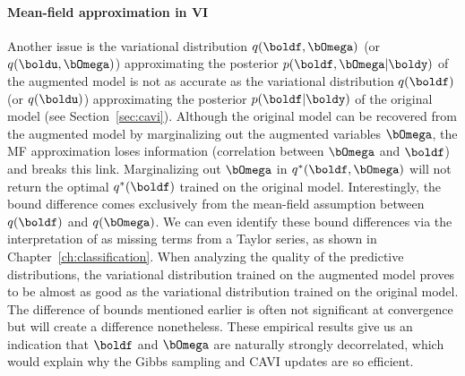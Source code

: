 \paragraph[]{Mean-field approximation in \ac{VI}}\mbox\\
Another issue is the variational distribution $q(\boldf, \bOmega)$ (or $q(\boldu, \bOmega)$) approximating the posterior $p(\boldf, \bOmega|\boldy)$ of the augmented model is not as accurate as the variational distribution $q(\boldf)$ (or $q(\boldu)$) approximating the posterior $p(\boldf|\boldy)$ of the original model (see Section~\ref{sec:cavi}).
Although the original model can be recovered from the augmented model by marginalizing out the augmented variables $\bOmega$, the \ac{MF} approximation loses information (correlation between $\bOmega$ and $\boldf$) and breaks this link.
Marginalizing out $\bOmega$ in $q^*(\boldf, \bOmega)$ will not return the optimal $q^*(\boldf)$ trained on the original model.
Interestingly, the bound difference comes exclusively from the mean-field assumption between $q(\boldf)$ and $q(\bOmega)$.
We can even identify these bound differences via the interpretation of \citet{jaakkolaVariationalApproachBayesian1997} as missing terms from a Taylor series, as shown in Chapter~\ref{ch:classification}.
When analyzing the quality of the predictive distributions, the variational distribution trained on the augmented model proves to be almost as good as the variational distribution trained on the original model.
The difference of bounds mentioned earlier is often not significant at convergence but will create a difference nonetheless.
These empirical results give us an indication that $\boldf$ and $\bOmega$ are naturally strongly decorrelated, which would explain why the Gibbs sampling and \ac{CAVI} updates are so efficient.




